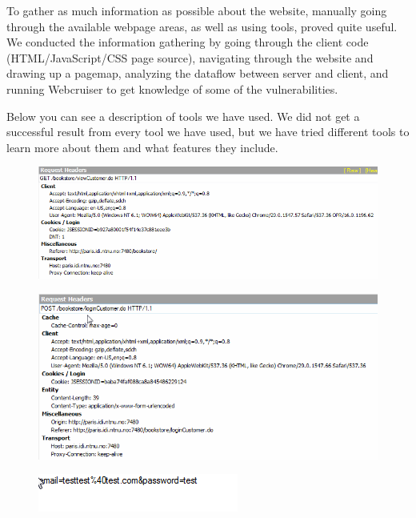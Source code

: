 To gather as much information as possible about the website, manually going through the available webpage areas, as well as using tools, proved quite useful. We conducted the information gathering by going through the client code (HTML/JavaScript/CSS page source), navigating through the website and drawing up a pagemap, analyzing the dataflow between server and client, and running Webcruiser to get knowledge of some of the vulnerabilities. 

Below you can see a description of tools we have used. We did not get a successful result from every tool we have used, but we have tried different tools to learn more about them and what features they include.


\begin{figure}[!ht]
\includegraphics[scale=0.5]{pics/Reguest1.png}
\end{figure}

\begin{figure}[!ht]
\includegraphics[scale=0.5]{pics/request2.png}
\end{figure}

\begin{figure}[!ht]
\includegraphics{pics/request10.png}
\end{figure}

